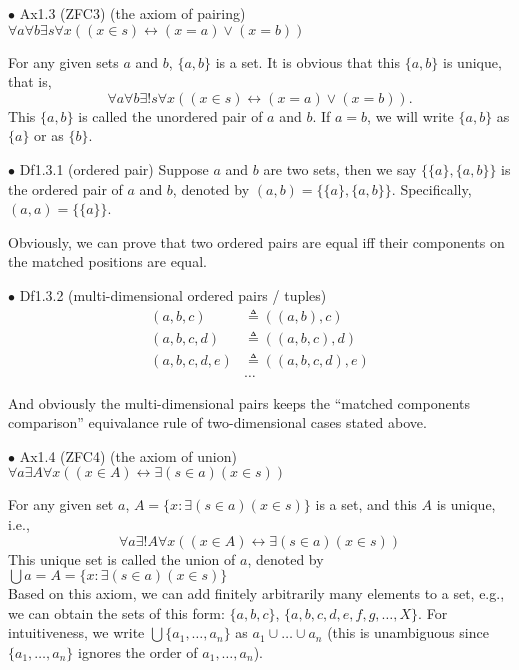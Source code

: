 \documentclass{article}
\begin{document}
\begin{Ax}{$\bullet$ Ax1.3 (ZFC3) (the axiom of pairing)}
    \textcolor{Ax}{$\forall a\forall b\exists s\forall x \left((x\in s)\leftrightarrow (x=a)\lor (x=b)\right)$}
\end{Ax}
For any given sets $a$ and $b$, $\{a,b\}$ is a set. It is obvious that \textcolor{Th}{this $\{a,b\}$ is unique, that is, $$\forall a\forall b\exists! s\forall x \left((x\in s)\leftrightarrow (x=a)\lor (x=b)\right).$$} \textcolor{Df}{This $\{a,b\}$ is called the unordered pair of $a$ and $b$. If $a=b$, we will write $\{a,b\}$ as $\{a\}$ or as $\{b\}$.}

\begin{Df}{$\bullet$ Df1.3.1 (ordered pair)}
    Suppose $a$ and $b$ are two sets, then we say $\{\{a\}, \{a,b\}\}$ is the ordered pair of $a$ and $b$, denoted by $(a,b) = \{\{a\}, \{a,b\}\}$. Specifically, $(a,a) = \{\{a\}\}$. 
\end{Df}
\textcolor{Th}{Obviously, we can prove that two ordered pairs are equal iff their components on the matched positions are equal.}

\begin{Df}{$\bullet$ Df1.3.2 (multi-dimensional ordered pairs / tuples)}
    \begin{align*}
        (a,b,c)&\triangleq ((a,b),c)\\
        (a,b,c,d)&\triangleq ((a,b,c),d)\\
        (a,b,c,d,e)&\triangleq ((a,b,c,d),e)\\
        &\dots
    \end{align*}
\end{Df}
And obviously \textcolor{Th}{the multi-dimensional pairs keeps the ``matched components comparison'' equivalance rule of two-dimensional cases stated above.}

\begin{Ax}{$\bullet$ Ax1.4 (ZFC4) (the axiom of union)}
    \textcolor{Ax}{$\forall a \exists A \forall x \left((x\in A)\leftrightarrow \exists (s\in a)(x\in s)\right)$}
\end{Ax}
For any given set $a$, $A = \{x: \exists (s\in a) (x\in s)\}$ is a set, \textcolor{Th}{and this $A$ is unique, i.e., 
$$\forall a \exists! A \forall x \left((x\in A)\leftrightarrow \exists (s\in a)(x\in s)\right)$$}
\textcolor{Df}{This unique set is called the union of $a$, denoted by $\bigcup a = A = \{x: \exists (s\in a) (x\in s)\}$}\\
Based on this axiom, we can add finitely arbitrarily many elements to a set, e.g., we can obtain the sets of this form: $\{a,b,c\}$, $\{a,b,c,d,e,f,g,\dots,X\}$. For intuitiveness, we write $\bigcup \{a_1, \dots, a_n\} $ as $a_1\cup \dots \cup a_n$ (this is unambiguous since $\{a_1, \dots, a_n\}$ ignores the order of $a_1,\dots, a_n$).
\end{document}
